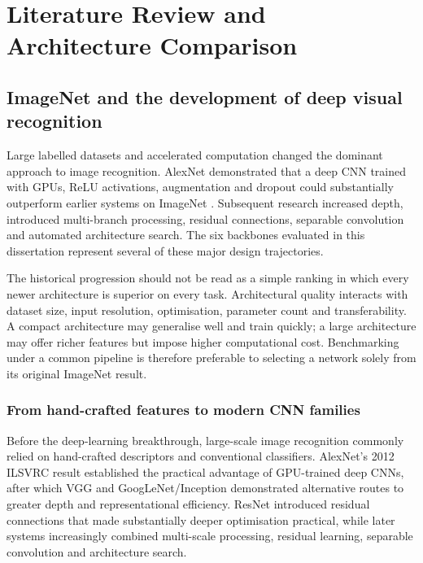 \chapter{Literature Review and Architecture Comparison}
\label{chap:literature}

\section{ImageNet and the development of deep visual recognition}
Large labelled datasets and accelerated computation changed the dominant approach to image recognition. AlexNet demonstrated that a deep CNN trained with GPUs, ReLU activations, augmentation and dropout could substantially outperform earlier systems on ImageNet \citep{krizhevsky2012imagenet}. Subsequent research increased depth, introduced multi-branch processing, residual connections, separable convolution and automated architecture search. The six backbones evaluated in this dissertation represent several of these major design trajectories.

The historical progression should not be read as a simple ranking in which every newer architecture is superior on every task. Architectural quality interacts with dataset size, input resolution, optimisation, parameter count and transferability. A compact architecture may generalise well and train quickly; a large architecture may offer richer features but impose higher computational cost. Benchmarking under a common pipeline is therefore preferable to selecting a network solely from its original ImageNet result.


\subsection{From hand-crafted features to modern CNN families}
Before the deep-learning breakthrough, large-scale image recognition commonly relied on hand-crafted descriptors and conventional classifiers. AlexNet's 2012 ILSVRC result established the practical advantage of GPU-trained deep CNNs, after which VGG and GoogLeNet/Inception demonstrated alternative routes to greater depth and representational efficiency. ResNet introduced residual connections that made substantially deeper optimisation practical, while later systems increasingly combined multi-scale processing, residual learning, separable convolution and architecture search.

